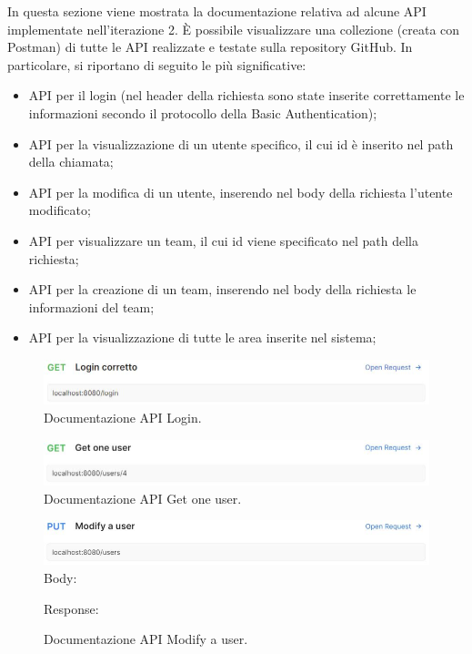 In questa sezione viene mostrata la documentazione relativa ad alcune API implementate nell'iterazione 2. \`E possibile visualizzare una collezione (creata con Postman) di tutte le API realizzate e testate sulla repository GitHub. In particolare, si riportano di seguito le più significative:
\begin{itemize}
	\item API per il login (nel header della richiesta sono state inserite correttamente le informazioni secondo il protocollo della Basic Authentication);
	\item API per la visualizzazione di un utente specifico, il cui id è inserito nel path della chiamata;
	\item API per la modifica di un utente, inserendo nel body della richiesta l'utente modificato;
	\item API per visualizzare un team, il cui id viene specificato nel path della richiesta;
	\item API per la creazione di un team, inserendo nel body della richiesta le informazioni del team;
	\item API per la visualizzazione di tutte le area inserite nel sistema;
\end{itemize}

\begin{figure}[h!]
	\centering
	\includegraphics[width=1\linewidth]{./Iterazione 2/ImageFiles/LoginCorrettoRequest}
	
	\caption{Documentazione API Login.}
	\label{fig:LoginAPI}
\end{figure}

\begin{figure}[h!]
	\centering
	\includegraphics[width=1\linewidth]{./Iterazione 2/ImageFiles/GetOneUser}
	
	\caption{Documentazione API Get one user.}
	\label{fig:GetOneUserAPI}
\end{figure}

\begin{figure}[h!]
	\centering
	\includegraphics[width=1\linewidth]{./Iterazione 2/ImageFiles/ModifyAUser}
	Body:
	
	Response: 
	
	\caption{Documentazione API Modify a user.}
	\label{fig:ModifyAUserAPI}
\end{figure}

